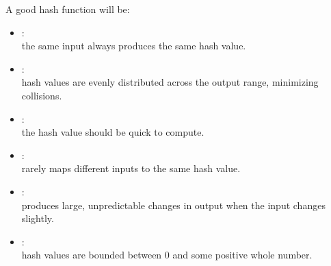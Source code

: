 \documentclass[mathserif, handout]{beamer}
\begin{document}
\begin{frame}
	A good hash function will be:
	\begin{itemize}
		\item {}: \\
		      \footnotesize\color{gray} the same input always produces the same hash value. \normalsize\color{black}
		\item {}: \\
		      \footnotesize\color{gray} hash values are evenly distributed across the output range, minimizing collisions. \normalsize\color{black}
		\item {}: \\
		      \footnotesize\color{gray} the hash value should be quick to compute. \normalsize\color{black}
		\item {}: \\
		      \footnotesize\color{gray} rarely maps different inputs to the same hash value. \normalsize\color{black}
		\item {}: \\
		      \footnotesize\color{gray} produces large, unpredictable changes in output when the input changes slightly. \normalsize\color{black}
		\item {}: \\
		      \footnotesize\color{gray} hash values are bounded between 0 and some positive whole number. \normalsize\color{black}
	\end{itemize}
\end{frame}
\end{document}
